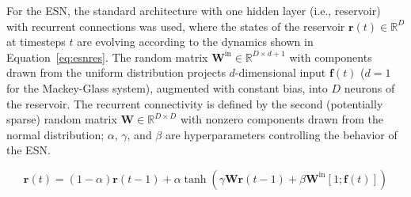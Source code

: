 



For the ESN, the standard architecture with one hidden layer (i.e., reservoir) with recurrent connections was used, where the states of the reservoir $\mathbf{r}(t) \in \mathbb{R}^{D}$ at timesteps $t$ are evolving according to the dynamics shown in Equation~\ref{eq:esnres}. 
The random matrix $\mathbf{W}^{\mathrm{in}} \in \mathbb{R}^{D  \times d+1}$ with components drawn from the uniform distribution projects $d$-dimensional input $\mathbf{f}(t)$ ($d=1$ for the Mackey-Glass system), augmented with constant bias, into $D$ neurons of the reservoir. The recurrent connectivity is defined by the second (potentially sparse) random matrix $\mathbf{W} \in \mathbb{R}^{D  \times D}$ 
with nonzero components drawn from the normal distribution; 
$\alpha$, $\gamma$, and $\beta$ are hyperparameters controlling the behavior of the ESN.

\begin{equation}
\mathbf{r}(t)=(1-\alpha)\mathbf{r}(t-1)+\alpha \tanh \left(\gamma\mathbf{W}\mathbf{r}(t-1) + \beta\mathbf{W}^{\mathrm{in}} [1; \mathbf{f}(t)] \right)
\label{eq:esnres}
 \end{equation}


